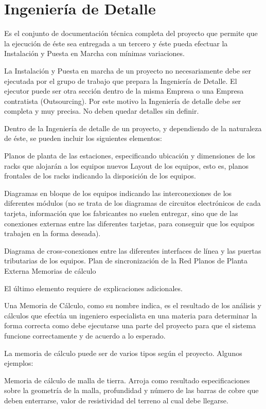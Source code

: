 \section{Ingenier\'ia de Detalle}\label{sec:ingdetalle}

Es el conjunto de documentación técnica completa del proyecto que permite que la ejecución 
de éste sea entregada a un tercero y éste pueda efectuar la Instalación y Puesta en Marcha 
con mínimas variaciones.

La Instalación y Puesta en marcha de un proyecto no necesariamente debe ser ejecutada por 
el grupo de trabajo que prepara la Ingeniería de Detalle. El ejecutor puede ser otra sección 
dentro de la misma Empresa o una Empresa contratista (Outsourcing). Por este motivo la 
Ingeniería de detalle debe ser completa y muy precisa. No deben quedar detalles sin definir.

Dentro de la Ingeniería de detalle de un proyecto, y dependiendo de la naturaleza de éste, se 
pueden incluir los siguientes elementos:

Planos de planta de las estaciones, especificando ubicación y dimensiones de los racks 
que alojarán a los equipos nuevos Layout de los equipos, esto es, planos frontales de los racks indicando la disposición 
de los equipos.

Diagramas en bloque de los equipos indicando las interconexiones de los diferentes 
módulos (no se trata de los diagramas de circuitos electrónicos de cada tarjeta, información que los fabricantes no suelen entregar, sino que de las conexiones 
externas entre las diferentes tarjetas, para conseguir que los equipos trabajen en la 
forma deseada).

Diagrama de cross-conexiones entre las diferentes interfaces de línea y las puertas 
tributarias de los equipos. 
Plan de sincronización de la Red 
Planos de Planta Externa 
Memorias de cálculo 
 
 
El último elemento requiere de explicaciones adicionales. 
 
Una Memoria de Cálculo, como su nombre indica, es el resultado de los análisis y cálculos 
que efectúa un ingeniero especialista en una materia para determinar la forma correcta como 
debe ejecutarse una parte del proyecto para que el sistema funcione correctamente y de 
acuerdo a lo esperado. 
 
La memoria de cálculo puede ser de varios tipos según el proyecto. Algunos ejemplos: 
 
Memoria de cálculo de malla de tierra. Arroja como resultado especificaciones sobre la 
geometría de la malla, profundidad y número de las barras de cobre que deben 
enterrarse, valor de resistividad del terreno al cual debe llegarse. 
 
